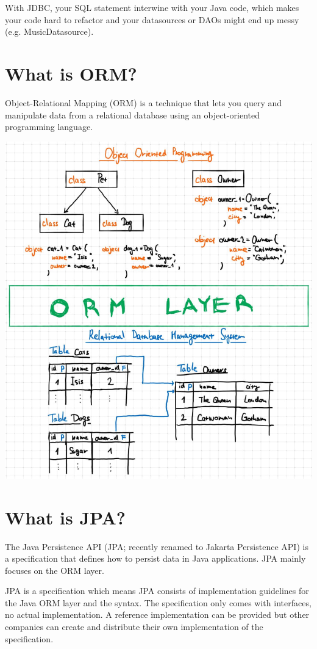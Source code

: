 With JDBC, your SQL statement interwine with your Java code,  which makes your code  hard to refactor and your datasources or DAOs might end up messy (e.g.  MusicDatasource).
  
\section{What is ORM?}

Object-Relational Mapping (ORM) is a technique that lets you query and manipulate data from a relational database using an object-oriented programming language.

\includegraphics[width=\textwidth]{./images/chapter6/orm}


\section{What is JPA?}

The Java Persistence API (JPA; recently renamed to Jakarta Persistence API) is a specification that defines how to persist data in Java applications. JPA mainly focuses on the ORM layer.

JPA is a specification which means JPA consists of implementation guidelines for the Java ORM layer and the syntax. The specification only comes with interfaces, no actual implementation.  A reference implementation can be provided but other companies can create and distribute their own implementation of the specification.


